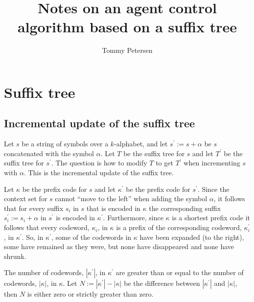 \documentclass[a4paper,11pt]{report}
\author{Tommy Petersen}
\title{Notes on an agent control algorithm based on a suffix tree}
\begin{document}
\maketitle

\newcommand{\R}{\mathbb{R}}
\newcommand{\Q}{\mathbb{Q}}
\newcommand{\Z}{\mathbb{Z}}
\newcommand{\N}{\mathbb{N}}

\newtheorem{lemma}{Lemma}[section]
\newtheorem{proposition}{Proposition}[section]
\newtheorem{theorem}{Theorem}[section]
\newtheorem{corollary}{Corollary}[section]
\newtheorem{algorithm}{Algorithm}[section]
\newtheorem{definition}{Definition}[section]
\newtheorem{example}{Example}[section]

\tableofcontents

\chapter{Suffix tree}
\section{Incremental update of the suffix tree}
Let $s$ be a string of symbols over a $k$-alphabet, and let $s^\prime := s + \alpha$ be $s$ concatenated with the
symbol $\alpha$. Let $T$ be the suffix tree for $s$ and let $T^\prime$ be the suffix tree for $s^\prime$. The question
is how to modify $T$ to get $T^\prime$ when incrementing $s$ with $\alpha$. This is the incremental update of the
suffix tree.

Let $\kappa$ be the prefix code for $s$ and let $\kappa^\prime$ be the prefix code for $s^\prime$. Since the context
set for $s$ cannot ``move to the left'' when adding the symbol $\alpha$, it follows that
for every suffix $s_i$ in $s$ that is encoded in $\kappa$ the corresponding suffix $s_i^\prime := s_i + \alpha$ in
$s^\prime$ is encoded in $\kappa^\prime$. Furthermore, since $\kappa$ is a shortest prefix code it follows that every
codeword, $\kappa_i$, in $\kappa$ is a prefix of the corresponding codeword, $\kappa_i^\prime$, in $\kappa^\prime$.
So, in $\kappa^\prime$, some of the codewords in $\kappa$ have been expanded (to the right), some have remained as they
were, but none have disappeared and none have shrunk.

The number of codewords, $|\kappa^\prime|$, in $\kappa^\prime$ are greater than or equal to the number of codewords,
$|\kappa|$, in $\kappa$. Let $N := |\kappa^\prime| - |\kappa|$ be the difference between $|\kappa^\prime|$ and $|\kappa|$,
then $N$ is either zero or strictly greater than zero.
\end{document}
